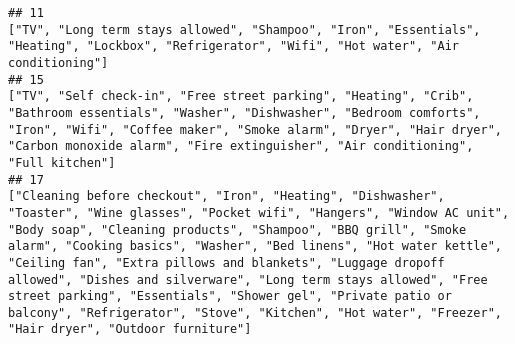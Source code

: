 \documentclass[
]{article}
\begin{document}
\begin{verbatim}
## 11                                                                                                                                                                                                                                                                                                                                                                                                                                                                                                                                                                                                                                                                                                                                                                                                                                                                                           ["TV", "Long term stays allowed", "Shampoo", "Iron", "Essentials", "Heating", "Lockbox", "Refrigerator", "Wifi", "Hot water", "Air conditioning"]
## 15                                                                                                                                                                                                                                                                                                                                                                                                                                                                                                                                                                                                                                                                                                                                                ["TV", "Self check-in", "Free street parking", "Heating", "Crib", "Bathroom essentials", "Washer", "Dishwasher", "Bedroom comforts", "Iron", "Wifi", "Coffee maker", "Smoke alarm", "Dryer", "Hair dryer", "Carbon monoxide alarm", "Fire extinguisher", "Air conditioning", "Full kitchen"]
## 17                                                                                                                                                                                                                                                                                                                                                                                                                                                       ["Cleaning before checkout", "Iron", "Heating", "Dishwasher", "Toaster", "Wine glasses", "Pocket wifi", "Hangers", "Window AC unit", "Body soap", "Cleaning products", "Shampoo", "BBQ grill", "Smoke alarm", "Cooking basics", "Washer", "Bed linens", "Hot water kettle", "Ceiling fan", "Extra pillows and blankets", "Luggage dropoff allowed", "Dishes and silverware", "Long term stays allowed", "Free street parking", "Essentials", "Shower gel", "Private patio or balcony", "Refrigerator", "Stove", "Kitchen", "Hot water", "Freezer", "Hair dryer", "Outdoor furniture"]

\end{verbatim}
\end{document}
